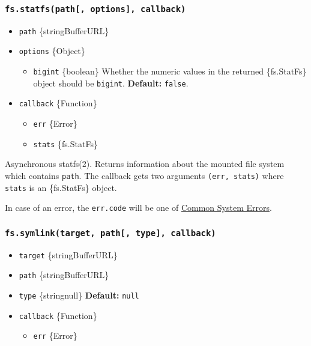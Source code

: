 \subsubsection{\texorpdfstring{\texttt{fs.statfs(path{[},\ options{]},\ callback)}}{fs.statfs(path{[}, options{]}, callback)}}\label{fs.statfspath-options-callback}

\begin{itemize}
\tightlist
\item
  \texttt{path} \{string\textbar Buffer\textbar URL\}
\item
  \texttt{options} \{Object\}

  \begin{itemize}
  \tightlist
  \item
    \texttt{bigint} \{boolean\} Whether the numeric values in the
    returned \{fs.StatFs\} object should be \texttt{bigint}.
    \textbf{Default:} \texttt{false}.
  \end{itemize}
\item
  \texttt{callback} \{Function\}

  \begin{itemize}
  \tightlist
  \item
    \texttt{err} \{Error\}
  \item
    \texttt{stats} \{fs.StatFs\}
  \end{itemize}
\end{itemize}

Asynchronous statfs(2). Returns information about the mounted file
system which contains \texttt{path}. The callback gets two arguments
\texttt{(err,\ stats)} where \texttt{stats} is an \{fs.StatFs\} object.

In case of an error, the \texttt{err.code} will be one of
\href{errors.md\#common-system-errors}{Common System Errors}.

\subsubsection{\texorpdfstring{\texttt{fs.symlink(target,\ path{[},\ type{]},\ callback)}}{fs.symlink(target, path{[}, type{]}, callback)}}\label{fs.symlinktarget-path-type-callback}

\begin{itemize}
\tightlist
\item
  \texttt{target} \{string\textbar Buffer\textbar URL\}
\item
  \texttt{path} \{string\textbar Buffer\textbar URL\}
\item
  \texttt{type} \{string\textbar null\} \textbf{Default:} \texttt{null}
\item
  \texttt{callback} \{Function\}

  \begin{itemize}
  \tightlist
  \item
    \texttt{err} \{Error\}
  \end{itemize}
\end{itemize}

